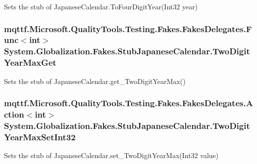 Sets the stub of Japanese\-Calendar.\-To\-Four\-Digit\-Year(\-Int32 year)

\hypertarget{class_system_1_1_globalization_1_1_fakes_1_1_stub_japanese_calendar_aba119ec203024f1c4fdd148d4560acf6}{
\subsubsection[{Two\-Digit\-Year\-Max\-Get}]{\setlength{\rightskip}{0pt plus 5cm}mqttf.\-Microsoft.\-Quality\-Tools.\-Testing.\-Fakes.\-Fakes\-Delegates.\-Func$<$int$>$ System.\-Globalization.\-Fakes.\-Stub\-Japanese\-Calendar.\-Two\-Digit\-Year\-Max\-Get}}\label{class_system_1_1_globalization_1_1_fakes_1_1_stub_japanese_calendar_aba119ec203024f1c4fdd148d4560acf6}


Sets the stub of Japanese\-Calendar.\-get\-\_\-\-Two\-Digit\-Year\-Max()

\hypertarget{class_system_1_1_globalization_1_1_fakes_1_1_stub_japanese_calendar_a66d93ad6f9047eb0f6e091fd96402e24}{
\subsubsection[{Two\-Digit\-Year\-Max\-Set\-Int32}]{\setlength{\rightskip}{0pt plus 5cm}mqttf.\-Microsoft.\-Quality\-Tools.\-Testing.\-Fakes.\-Fakes\-Delegates.\-Action$<$int$>$ System.\-Globalization.\-Fakes.\-Stub\-Japanese\-Calendar.\-Two\-Digit\-Year\-Max\-Set\-Int32}}\label{class_system_1_1_globalization_1_1_fakes_1_1_stub_japanese_calendar_a66d93ad6f9047eb0f6e091fd96402e24}


Sets the stub of Japanese\-Calendar.\-set\-\_\-\-Two\-Digit\-Year\-Max(\-Int32 value)



